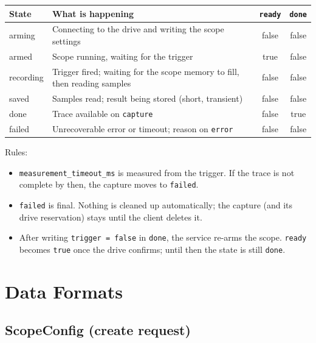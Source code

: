 \documentclass[11pt,a4paper]{article}
\newcommand{\dl}[1]{\texttt{#1}}
\begin{document}
\begin{center}
\small
\begin{tabularx}{\textwidth}{@{}>{\ttfamily}l X c c@{}}
\toprule
\normalfont State & What is happening & \dl{ready} & \dl{done} \\
\midrule
arming    & Connecting to the drive and writing the scope settings & false & false \\
armed     & Scope running, waiting for the trigger                 & true  & false \\
recording & Trigger fired; waiting for the scope memory to fill, then reading samples & false & false \\
saved     & Samples read; result being stored (short, transient)  & false & false \\
done      & Trace available on \dl{capture}                       & false & true  \\
failed    & Unrecoverable error or timeout; reason on \dl{error}   & false & false \\
\bottomrule
\end{tabularx}
\end{center}

Rules:
\begin{itemize}[nosep]
  \item \dl{measurement\_timeout\_ms} is measured from the trigger. If the trace
        is not complete by then, the capture moves to \dl{failed}.
  \item \dl{failed} is final. Nothing is cleaned up automatically; the capture
        (and its drive reservation) stays until the client deletes it.
  \item After writing \dl{trigger = false} in \dl{done}, the service re-arms the
        scope. \dl{ready} becomes \dl{true} once the drive confirms; until then
        the state is still \dl{done}.
\end{itemize}

\section{Data Formats}

\subsection{ScopeConfig (create request)}
\end{document}
